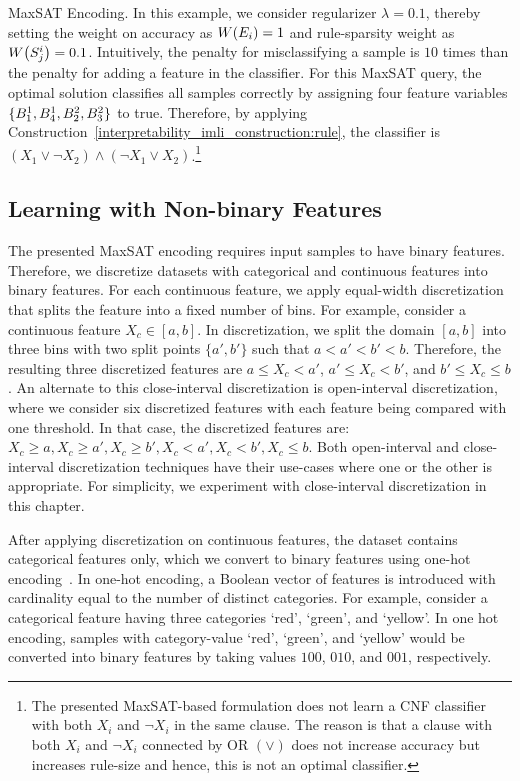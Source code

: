 \begin{example}{MaxSAT Encoding.}
In this example, we consider regularizer $ \lambda = 0.1 $, thereby setting the weight on accuracy as $ W \! \left( E_i \right) = 1 $ and rule-sparsity weight as $ W \! \left( S_j^i \right) = 0.1 $. Intuitively, the penalty for misclassifying a sample is $ 10 $ times than the penalty for adding a feature in the classifier. For this MaxSAT query, the optimal solution classifies all samples correctly by assigning four feature variables $ \{B^1_1, B^1_4, B^2_2, B^2_3\} $ to true. Therefore, by applying Construction~\ref{interpretability_imli_construction:rule}, the classifier is $ (X_1 \vee \neg X_2)  \wedge (\neg X_1 \vee X_2) $.\footnote{The presented MaxSAT-based formulation does not learn a CNF classifier with both $ X_i $ and $ \neg X_i $ in the same clause. The reason is that a clause with both $ X_i $ and $ \neg X_i $ connected by OR $ (\vee) $ does not increase accuracy but increases rule-size and hence, this is not an optimal classifier.}
	
\end{example}
	
	
\subsection{Learning with Non-binary Features}
	\label{interpretability_imli_sec:non-binary}
	The presented MaxSAT encoding requires input samples to have binary features. Therefore, we discretize datasets with categorical and continuous features into binary features. For each continuous feature, we apply equal-width discretization that splits the feature into a fixed number of bins. For example, consider a continuous feature $ X_c \in [a,b] $. In discretization, we split the domain $ [a,b] $ into three bins with two split points $ \{a',b'\} $ such that $ a<a'<b'<b $.  Therefore, the resulting three discretized features are $ { a \le X_c < a'} $, $ {a' \le X_c < b'} $, and $ { b' \le X_c  \le b } $. An alternate to this close-interval discretization is open-interval discretization, where we consider six discretized features with each feature being compared with one threshold. In that case, the discretized features are: $ X_c \ge a, X_c \ge a', X_c \ge b', X_c < a', X_c < b', X_c \le b $. Both open-interval and close-interval discretization techniques have their use-cases where one or the other is appropriate. For simplicity, we experiment with close-interval discretization in this chapter.
	
	After applying discretization on continuous features, the dataset contains categorical features only, which we convert to binary features using one-hot encoding~\cite{lakkaraju2019faithful}. In one-hot encoding, a Boolean vector of features is introduced with cardinality equal to the number of distinct categories. For example, consider a categorical feature having three categories `red', `green', and `yellow'. In one hot encoding, samples with category-value `red', `green', and `yellow' would be converted into binary features by taking values $ 100 $, $ 010 $, and $ 001 $, respectively. 
	
